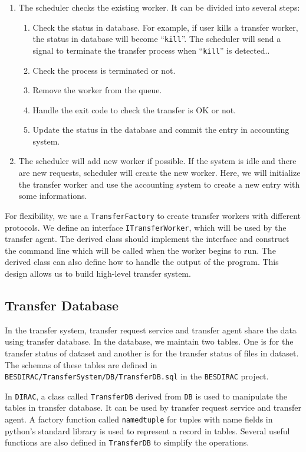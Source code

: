\begin{enumerate}
\item The scheduler checks the existing worker.
It can be divided into several steps:
\begin{enumerate}
    \item Check the status in database.
          For example, if user kills a transfer worker, the status in
          database will become ``\verb"kill"''.
          The scheduler will
          send a signal to terminate the
          transfer process when ``\verb"kill"'' is detected..
    \item Check the process is terminated or not.
    \item Remove the worker from the queue.
    \item Handle the exit code to check the transfer is OK or not.
    \item Update the status in the database 
          and commit the entry in accounting system.
\end{enumerate}
\item The scheduler will add new worker if possible.
If the system is idle and there are new requests,
scheduler will create the new worker.
Here, we will initialize the transfer worker and use the accounting
system to create a new entry with some informations.
\end{enumerate}
For flexibility, we use a {\tt TransferFactory} to create transfer workers
with different protocols. 
We define an interface {\tt ITransferWorker},
which will be used by the transfer agent. The derived class should
implement the interface and construct the command line which will 
be called when the worker begins to run.
The derived class can also define how to handle the output of the 
program.
This design allows us to build high-level transfer system.

\subsection{Transfer Database}

In the transfer system, transfer request service and transfer agent
share the data using transfer database. In the database, we maintain
two tables.
One is for the transfer status of dataset 
and another is for the transfer status of files in dataset. 
The schemas of these tables are defined 
in {\tt BESDIRAC/TransferSystem/DB/TransferDB.sql} in the {\tt BESDIRAC}
project\cite{bib:besdirac}.

In {\tt DIRAC}, a class called {\tt TransferDB} 
derived from {\tt DB} is used to manipulate
the tables in transfer database.
It can be used by transfer request 
service and transfer agent. A factory function called \verb"namedtuple" 
for tuples with name fields
in python's standard library
is used to represent a record in tables.
Several useful functions are also defined in {\tt TransferDB}
to simplify the operations.
